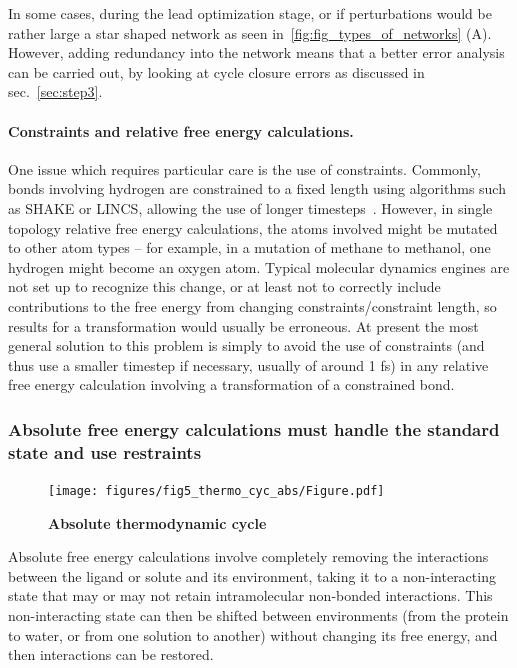 \documentclass[9pt,bestpractices]{livecoms}
\begin{document}
In some cases, during the lead optimization stage, or if perturbations would be rather large a star shaped network as seen in~\ref{fig:fig_types_of_networks} (A). However, adding redundancy into the network means that a better error analysis can be carried out, by looking at cycle closure errors as discussed in sec.~\ref{sec:step3}.


\paragraph{Constraints and relative free energy calculations.}
One issue which requires particular care is the use of constraints.
Commonly, bonds involving hydrogen are constrained to a fixed length using algorithms such as SHAKE or LINCS, allowing the use of longer timesteps~\cite{}.
However, in single topology relative free energy calculations, the atoms involved might be mutated to other atom types -- for example, in a mutation of methane to methanol, one hydrogen might become an oxygen atom.
Typical molecular dynamics engines are not set up to recognize this change, or at least not to correctly include contributions to the free energy from changing constraints/constraint length, so results for a transformation would usually be erroneous.
At present the most general solution to this problem is simply to avoid the use of constraints (and thus use a smaller timestep if necessary, usually of around 1 fs) in any relative free energy calculation involving a transformation of a constrained bond.

\subsubsection{Absolute free energy calculations must handle the standard state and use restraints}
\label{sec:standardstate-restraints}

\begin{figure}
    \texttt{[image: figures/fig5\_thermo\_cyc\_abs/Figure.pdf]}
    \caption{\textbf{Absolute thermodynamic cycle}}
    \label{fig:fig_absolute_thermodynamic_cycle}
\end{figure}

Absolute free energy calculations involve completely removing the interactions between the ligand or solute and its environment, taking it to a non-interacting state that may or may not retain intramolecular non-bonded interactions.
This non-interacting state can then be shifted between environments (from the protein to water, or from one solution to another) without changing its free energy, and then interactions can be restored.
\end{document}
